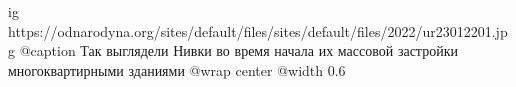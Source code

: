 
 
 
 
 

\ifcmt
  ig https://odnarodyna.org/sites/default/files/sites/default/files/2022/ur23012201.jpg
  @caption Так выглядели Нивки во время начала их массовой застройки многоквартирными зданиями 
	@wrap center
	@width 0.6
\fi
